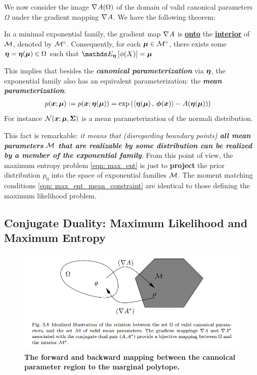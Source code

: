 \documentclass[11pt]{article}
\begin{document}
We now consider the image $\nabla_{}{A}(\Omega)$ of the domain of valid canonical parameters $\Omega$ under the gradient mapping $\nabla_{}{A}$. We have the following theorem:
\begin{theorem}
In a minimal exponential family, the gradient map $\nabla_{}{A}$ is \underline{\textbf{onto}} the \underline{\textbf{interior}} of ${\mathcal M}$, denoted by ${\mathcal M}^{\circ}$. Consequently, for each
$\boldsymbol{\mu} \in {\mathcal M}^{\circ}$, there exists some $\boldsymbol{\eta} = \boldsymbol{\eta}(\boldsymbol{\mu}) \in  \Omega$ such that $\E{\mb{\eta}}{\phi(X)} = \mb{\mu}$
\end{theorem} This implies that besides the \emph{\textbf{canonical parameterization}} via $\boldsymbol{\eta}$, the exponential family also has an equivalent parameterization: the \textbf{\emph{mean parameterization}}:
\begin{align*}
p(\boldsymbol{x}; \boldsymbol{\mu}):= p(\boldsymbol{x}; \boldsymbol{\eta}(\boldsymbol{\mu})) &= \exp\left(\left\langle \boldsymbol{\eta}(\boldsymbol{\mu})\,,\, \boldsymbol{\phi}(\boldsymbol{x}) \right\rangle - A(\boldsymbol{\eta}(\boldsymbol{\mu}))\right) 
\end{align*} For instance ${\mathcal N}(\boldsymbol{x}; \boldsymbol{\mu}, \boldsymbol{\Sigma})$ is a mean parameterization of the normali distribution. 

 
This fact is remarkable: \emph{it means that (disregarding boundary points) \textbf{all mean parameters ${\mathcal M}$ that are realizable by some distribution can be realized by a member of the exponential family}}.  From this point of view, the maximum entropy problem \eqref{eqn: max_ent} is just to \textbf{project} the prior distribution $p_0$ into the space of exponential families ${\mathcal M}$. The moment matching conditions \eqref{eqn: max_ent_mean_constraint}  are identical to those defining the maximum likelihood problem. 
 

\subsection{Conjugate Duality: Maximum Likelihood and Maximum Entropy}
\begin{figure}
\begin{minipage}[t]{1\linewidth}
  \centering
  \centerline{\includegraphics[scale = 0.45]{forward_backward_mapping.png}}
\end{minipage}
\caption{\footnotesize{\textbf{The forward and backward mapping between the cannoical parameter region to the marginal polytope.}}}
\label{fig: forward_backward_mapping}
\end{figure}
\end{document}
